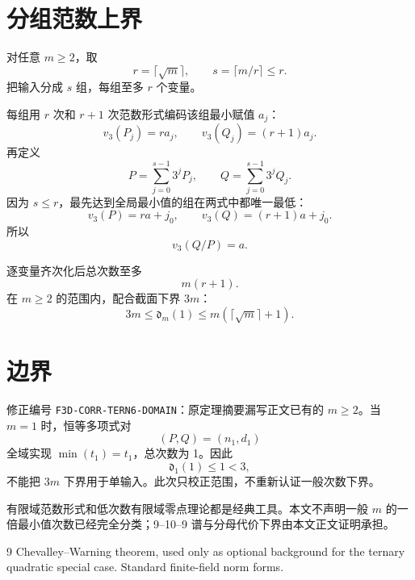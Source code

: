 \documentclass[11pt,a4paper]{ctexart}
\begin{document}
\section{分组范数上界}
对任意 \(m\ge2\)，取
\[
r=\lceil\sqrt m\rceil,
\qquad
s=\lceil m/r\rceil\le r.
\]
把输入分成 \(s\) 组，每组至多 \(r\) 个变量。

每组用 \(r\) 次和 \(r+1\) 次范数形式编码该组最小赋值 \(a_j\)：
\[
v_3(P_j)=ra_j,
\qquad
v_3(Q_j)=(r+1)a_j.
\]
再定义
\[
P=\sum_{j=0}^{s-1}3^jP_j,
\qquad
Q=\sum_{j=0}^{s-1}3^jQ_j.
\]
因为 \(s\le r\)，最先达到全局最小值的组在两式中都唯一最低：
\[
v_3(P)=ra+j_0,
\qquad
v_3(Q)=(r+1)a+j_0.
\]
所以
\[
v_3(Q/P)=a.
\]

逐变量齐次化后总次数至多
\[
m(r+1).
\]
在 \(m\ge2\) 的范围内，配合截面下界 \(3m\)：
\[
\boxed{
3m
\le
\mathfrak d_m(1)
\le
m(\lceil\sqrt m\rceil+1).
}
\]

\section{边界}
修正编号 \texttt{F3D-CORR-TERN6-DOMAIN}：原定理摘要漏写正文已有的 \(m\ge2\)。当 \(m=1\) 时，恒等多项式对
\[
(P,Q)=(n_1,d_1)
\]
全域实现 \(\min(t_1)=t_1\)，总次数为 1。因此
\[
\mathfrak d_1(1)\le1<3,
\]
不能把 \(3m\) 下界用于单输入。此次只校正范围，不重新认证一般次数下界。

有限域范数形式和低次数有限域零点理论都是经典工具。本文不声明一般 \(m\) 的一倍最小值次数已经完全分类；9--10--9 谱与分母代价下界由本文正文证明承担。

\begin{thebibliography}{9}
 Chevalley--Warning theorem, used only as optional background for the ternary quadratic special case.
 Standard finite-field norm forms.
\end{thebibliography}
\end{document}
